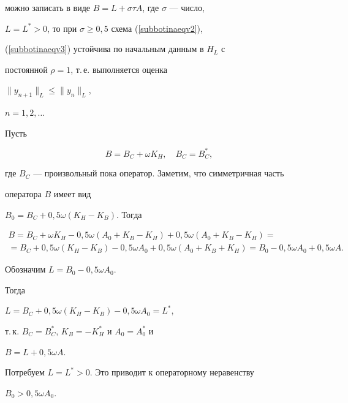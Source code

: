 можно записать в виде $B=L+ \sigma \tau A$, где $\sigma$ --- число,


$L=L^*>0$, то при $\sigma \ge 0{,}5$ схема (\ref{subbotinaeqv2}),


(\ref{subbotinaeqv3}) устойчива по начальным данным в $H_L$ с 


постоянной $\rho =1$, т.\,е. выполняется оценка


$\| {y_{n+1} } \|_L  \le \| {y_n }\|_L$,


$n=1,2,\dotsc$





Пусть 


\begin{equation} \label{subbotinaeqv5}


B=B_C+\omega K_H, \quad  B_C=B_C^*,


\end{equation}


где $B_C$ --- произвольный пока оператор. Заметим, что симметричная часть 


оператора $B$ имеет вид


$B_0=B_C+0{,}5 \omega \left({K_H - K_B} \right)$. Тогда


\begin{gather*}


B=B_C +\omega K_H  - 0{,}5\omega \left({A_0 +K_B  - K_H }


\right)+0{,}5\omega


\left({A_0 +K_B  - K_H } \right)= \\


= B_C +0{,}5\omega \left({K_H  - K_B } \right) -


0{,}5\omega A_0 +0{,}5\omega \left({A_0


+ K_B +K_H } \right)=B_0  - 0{,}5\omega A_0 +0{,}5\omega A.


\end{gather*}





Обозначим $L=B_0 - 0{,}5\omega A_0$.


Тогда


$L=B_C+0{,}5\omega \left({K_H - K_B} \right)-0{,}5\omega A_0=L^*$,


т.\,к. $B_C=B_C^*$, $K_B= -K_H^*$ и $A_0=A_0^*$ и


$B=L+0{,}5 \omega A$.


Потребуем $L=L^* > 0$. Это приводит к операторному неравенству


$B_0 > 0{,}5 \omega A_0$.





